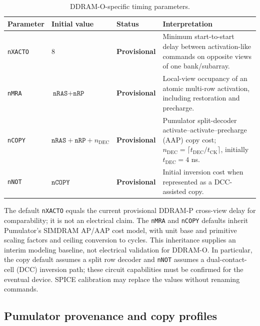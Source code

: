 \documentclass[9pt,twocolumn]{extarticle}
\newcommand{\param}[1]{\texttt{#1}}
\newcommand{\provisional}{\textcolor{DDRAMOrange}{\textbf{Provisional}}}
\begin{document}
\begin{table}[t]
\centering
\caption{DDRAM-O-specific timing parameters.}
\label{tab:parameters}
\begin{tabularx}{\textwidth}{@{}l l l X@{}}
\toprule
Parameter & Initial value & Status & Interpretation \\
\midrule
\param{nXACTO} & $8$ & \provisional{} & Minimum start-to-start delay between activation-like commands on opposite views of one bank/subarray. \\
\param{nMRA} & $\param{nRAS}+\param{nRP}$ & \provisional{} & Local-view occupancy of an atomic multi-row activation, including restoration and precharge. \\
\param{nCOPY} & $\param{nRAS}+\param{nRP}+n_{\mathrm{DEC}}$ & \provisional{} & Pumulator split-decoder activate--activate--precharge (AAP) copy cost; $n_{\mathrm{DEC}}=\lceil t_{\mathrm{DEC}}/t_{\mathrm{CK}}\rceil$, initially $t_{\mathrm{DEC}}=4$ ns. \\
\param{nNOT} & $\param{nCOPY}$ & \provisional{} & Initial inversion cost when represented as a DCC-assisted copy. \\
\bottomrule
\end{tabularx}
\end{table}

The default \param{nXACTO} equals the current provisional DDRAM-P cross-view
delay for comparability; it is not an electrical claim. The \param{nMRA} and
\param{nCOPY} defaults inherit Pumulator's SIMDRAM AP/AAP cost model, with
unit base and primitive scaling factors and ceiling conversion to cycles.
This inheritance supplies an interim modeling baseline, not electrical
validation for DDRAM-O. In particular, the copy default assumes a split row
decoder and \param{nNOT} assumes a dual-contact-cell (DCC) inversion path;
these circuit capabilities must be confirmed for the eventual device.
SPICE calibration may replace the values without renaming commands.

\subsection{Pumulator provenance and copy profiles}
\label{sec:pumulator}
\end{document}
